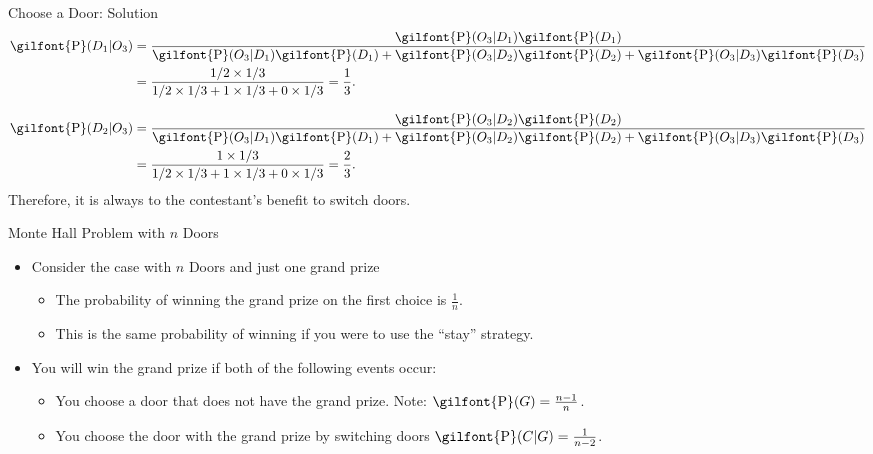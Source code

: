 \documentclass[
  ignorenonframetext,
]{beamer}
\providecommand{\tightlist}{%
  \setlength{\itemsep}{0pt}\setlength{\parskip}{0pt}}
\begin{document}
\begin{frame}{Choose a Door: Solution}
\label{choose-a-door-solution-2}
\begin{equation*}
\begin{split}
\textrm{\gilfont{P}}\normalfont (D_1|O_3)&=\dfrac{\textrm{\gilfont{P}}\normalfont (O_3|D_1)\textrm{\gilfont{P}}\normalfont (D_1)}{\textrm{\gilfont{P}}\normalfont (O_3|D_1)\textrm{\gilfont{P}}\normalfont (D_1)+\textrm{\gilfont{P}}\normalfont (O_3|D_2)\textrm{\gilfont{P}}\normalfont (D_2)+\textrm{\gilfont{P}}\normalfont (O_3|D_3)\textrm{\gilfont{P}}\normalfont (D_3)}\\
&=\dfrac{1/2 \times 1/3}{1/2 \times 1/3 + 1 \times 1/3 + 0 \times
1/3}=\dfrac{1}{3}.
\end{split}
\end{equation*}

\begin{equation*}
\begin{split}
\textrm{\gilfont{P}}\normalfont (D_2|O_3)&=\dfrac{\textrm{\gilfont{P}}\normalfont (O_3|D_2)\textrm{\gilfont{P}}\normalfont (D_2)}{\textrm{\gilfont{P}}\normalfont (O_3|D_1)\textrm{\gilfont{P}}\normalfont (D_1)+\textrm{\gilfont{P}}\normalfont (O_3|D_2)\textrm{\gilfont{P}}\normalfont (D_2)+\textrm{\gilfont{P}}\normalfont (O_3|D_3)\textrm{\gilfont{P}}\normalfont (D_3)}\\
&=\dfrac{1 \times 1/3}{1/2 \times 1/3 + 1 \times 1/3 + 0 \times
1/3}=\dfrac{2}{3}.
\end{split}
\end{equation*} Therefore, it is always to the contestant's benefit to
switch doors.
\end{frame}

\begin{frame}{Monte Hall Problem with \(n\) Doors}
\label{monte-hall-problem-with-n-doors}
\begin{itemize}
\item
  Consider the case with \(n\) Doors and just one grand prize

  \begin{itemize}
  \tightlist
  \item
    The probability of winning the grand prize on the first choice is
    \(\frac{1}{n}\).
  \item
    This is the same probability of winning if you were to use the
    ``stay'' strategy.
  \end{itemize}
\item
  You will win the grand prize if both of the following events occur:

  \begin{itemize}
  \tightlist
  \item
    You choose a door that does not have the grand prize. Note:
    \(\textrm{\gilfont{P}}\normalfont (G)=\frac{n-1}{n}\).
  \item
    You choose the door with the grand prize by switching doors
    \(\textrm{\gilfont{P}}\normalfont (C|G)=\frac{1}{n-2}\).
  \end{itemize}
\end{itemize}
\end{frame}
\end{document}
